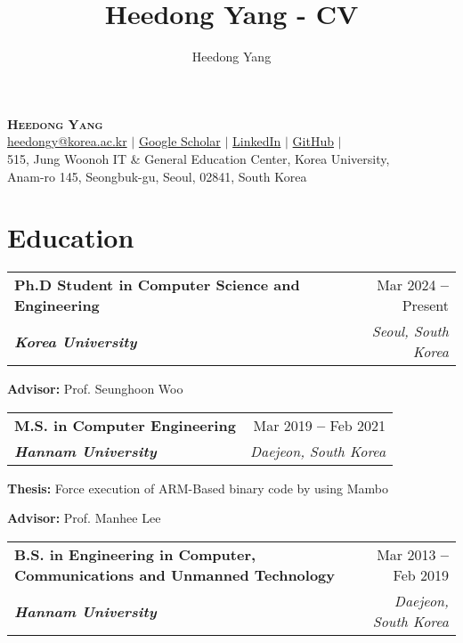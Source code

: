 \documentclass[letterpaper,11pt]{article}
\makeatletter
\newcommand{\resumeEducationHeading}[4]{
  \vspace{-2pt}\item
    \begin{tabular*}{0.97\textwidth}[t]{l@{\extracolsep{\fill}}r}
      \textbf{#1} & #2 \\
      \textit{\textbf{\small#3}} & \textit{\small #4} \\
    \end{tabular*}\vspace{-5pt}
}
\newcommand{\resumeSubHeadingListStart}{\begin{itemize}[leftmargin=0.2in]}
\newcommand{\resumeSubHeadingListEnd}{\end{itemize}}
\newcommand{\resumeSubHeadingItemListStart}{\begin{itemize}[label=-, leftmargin=0.15in]}
\newcommand{\resumeSubHeadingItemListEnd}{\end{itemize}\vspace{-5pt}}
\makeatother
\begin{document}
\title{Heedong Yang - CV}
\author{Heedong Yang}


\begin{center}
    \textbf{\Huge \scshape Heedong Yang} \\ \vspace{7pt}
    \small
    \faEnvelope \hspace{.5pt} \href{mailto:heedongy@korea.ac.kr}{heedongy@korea.ac.kr}
    $|$
    \faGraduationCap \hspace{.5pt} \href{https://scholar.google.co.kr/citations?user=Gqegeu0AAAAJ}{Google Scholar}
    $|$
    \faLinkedinSquare \hspace{.5pt} \href{https://www.linkedin.com/in/heedongy}{LinkedIn}
    $|$
    \faGithub \hspace{.5pt} \href{https://github.com/heedongy}{GitHub}
    $|$ \\
    \faMapMarker \hspace{.5pt} 515, Jung Woonoh IT \& General Education Center, Korea University, \\
    \hspace{15pt} Anam-ro 145, Seongbuk-gu, Seoul, 02841, South Korea
\end{center}




\section{Education}
  \vspace{3pt}
  \resumeSubHeadingListStart
  \resumeEducationHeading
     {Ph.D Student in Computer Science and Engineering}
     {Mar 2024 \textbf{--} Present}
     {Korea University}{Seoul, South Korea}
        \resumeSubHeadingItemListStart
        \small{\item{\textbf{Advisor:} Prof. Seunghoon Woo}}
        \resumeSubHeadingItemListEnd
   \resumeEducationHeading
     {M.S. in Computer Engineering}   %
     {Mar 2019 \textbf{--} Feb 2021}
     {Hannam University}{Daejeon, South Korea}
        \resumeSubHeadingItemListStart
        \small{\item{\textbf{Thesis:} Force execution of ARM-Based binary code by using Mambo}
        \item{\textbf{Advisor:} Prof. Manhee Lee}}
        \resumeSubHeadingItemListEnd
    \resumeEducationHeading
      {B.S. \small{in Engineering in Computer, Communications and Unmanned Technology}}
      {Mar 2013 \textbf{--} Feb 2019}
      {Hannam University}{Daejeon, South Korea}
  \resumeSubHeadingListEnd
\end{document}
